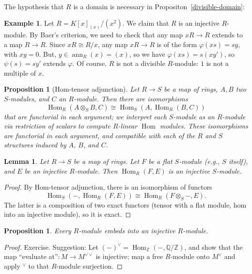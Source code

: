 \documentclass[11pt]{book}
\newtheorem{lemma}[theorem]{Lemma}
\newtheorem{proposition}[theorem]{Proposition}
\numberwithin{equation}{section}
\numberwithin{theorem}{chapter}
\theoremstyle{definition}
\newtheorem{example}[theorem]{Example}
\newtheorem*{basic properties}{Basic Properties}
\newtheorem*{Important Remark}{Important Remark}
\theoremstyle{remark}
\newcommand{\ZZ}{\mathbb{Z}}
\newcommand{\QQ}{\mathbb{Q}}
\newcommand{\Hom}{\operatorname{Hom}}
\newcommand{\ann}{\operatorname{ann}}
\begin{document}
The hypothesis that $R$ is a domain is necessary in Propositon~\ref{divisible-domain}:

\begin{example}\label{ex:x2-self-injective}
	Let $R=K[x]_{(x)}/(x^2)$. We claim that $R$ is an injective $R$-module. By Baer's criterion, we need to check that any map $xR\to R$ extends to a map $R\to R$. Since $xR\cong R/x$, any map $xR\to R$ is of the form $\varphi(xs)=sy$, with $xy=0$. But, $y\in \ann_R(x)=(x)$, so we have $\varphi(xs)=s(xy')$, so $\psi(s)=sy'$ extends $\varphi$. Of course, $R$ is not a divisible $R$-module: $1$ is not a multiple of $x$.
\end{example}

\begin{proposition}[Hom-tensor adjunction]
	Let $R\rightarrow S$ be a map of rings, $A,B$ two $S$-modules, and $C$ an $R$-module. Then there are isomorphisms
	\[ \Hom_R(A \otimes_S B, C) \cong \Hom_S( A, \Hom_R(B,C)) \]
	that are functorial in each argument; we interpret each $S$-module as an $R$-module via restriction of scalars to compute $R$-linear $\Hom$ modules. These isomorphisms are functorial in each argument, and compatible with each of the $R$ and $S$ structures induced by $A$, $B$, and $C$. 
\end{proposition}

\begin{lemma}\label{hom-injective}
	Let $R\to S$ be a map of rings. Let $F$ be a flat $S$-module (e.g., $S$ itself), and $E$ be an injective $R$-module. Then $\Hom_R(F,E)$ is an injective $S$-module.
\end{lemma}
\begin{proof}
	By Hom-tensor adjunction, there is an isomorphism of functors
	\[ \Hom_S(-,\Hom_R(F,E))\cong \Hom_R(F\otimes_S -, E). \]
	The latter is a composition of two exact functors (tensor with a flat module, hom into an injective module), so it is exact.
\end{proof}

\begin{proposition}
	Every $R$-module embeds into an injective $R$-module.
\end{proposition}
\begin{proof}
	Exercise. Suggestion: Let $(-)^{\vee}=\Hom_{\ZZ}(-,\QQ/\ZZ)$, and show that the map ``evaluate at''$:M\to M^{\vee\vee}$ is injective; map a free $R$-module onto $M^{\vee}$ and apply ${}^{\vee}$ to that $R$-module surjection.
\end{proof}
\end{document}

